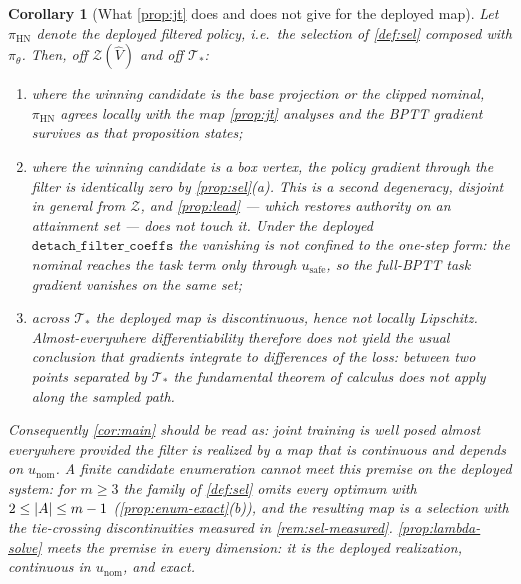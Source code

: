 \documentclass[11pt]{article}
\theoremstyle{plain}
\newtheorem{corollary}[theorem]{Corollary}
\theoremstyle{definition}
\theoremstyle{remark}
\DeclarePairedDelimiter{\abs}{\lvert}{\rvert}
\newcommand{\calT}{\mathcal{T}}
\newcommand{\Vhat}{\widehat V}
\begin{document}
\begin{corollary}[What \cref{prop:jt} does and does not give for the deployed map]\label{cor:jt-deployed}
Let $\pi_{\mathrm{HN}}$ denote the deployed filtered policy, i.e.\ the selection of
\cref{def:sel} composed with $\pi_\theta$. Then, off $\mathcal Z(\Vhat)$ and off $\calT_\ast$:
\begin{enumerate}[label=(\alph*)]
  \item where the winning candidate is the base projection or the clipped nominal,
  $\pi_{\mathrm{HN}}$ agrees locally with the map \cref{prop:jt} analyses and the BPTT gradient
  survives as that proposition states;
  \item where the winning candidate is a box vertex, the policy gradient through the filter is
  \emph{identically zero} by \cref{prop:sel}(a). This is a second degeneracy, disjoint in general
  from $\mathcal Z$, and \cref{prop:lead} --- which restores authority on an attainment set ---
  does not touch it. Under the deployed $\texttt{detach\_filter\_coeffs}$ the vanishing is not
  confined to the one-step form: the nominal reaches the task term only through
  $u_{\mathrm{safe}}$, so the full-BPTT task gradient vanishes on the same set;
  \item across $\calT_\ast$ the deployed map is discontinuous, hence not locally Lipschitz.
  Almost-everywhere differentiability therefore does \emph{not} yield the usual conclusion that
  gradients integrate to differences of the loss: between two points separated by $\calT_\ast$
  the fundamental theorem of calculus does not apply along the sampled path.
\end{enumerate}
Consequently \cref{cor:main} should be read as: joint training is well posed almost everywhere
\emph{provided the filter is realized by a map that is continuous and depends on
$u_{\mathrm{nom}}$}. A finite candidate enumeration cannot meet this premise on the deployed system: for $m\ge3$
the family of \cref{def:sel} omits every optimum with $2\le\abs A\le m-1$
(\cref{prop:enum-exact}(b)), and the resulting map is a selection with the tie-crossing
discontinuities measured in \cref{rem:sel-measured}. \cref{prop:lambda-solve} meets the premise in
every dimension: it is the deployed realization, continuous in $u_{\mathrm{nom}}$, and exact.
\end{corollary}
\end{document}
